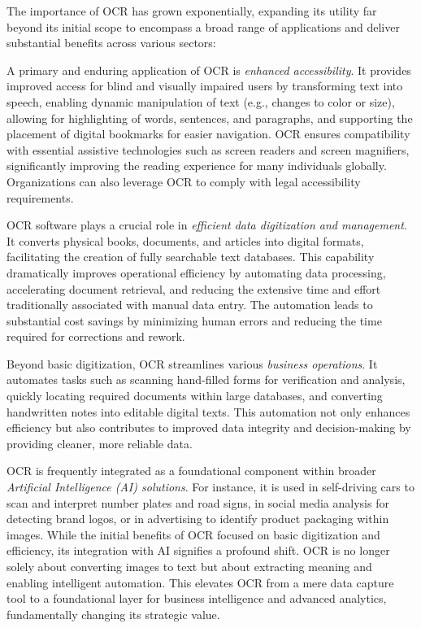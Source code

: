 The importance of OCR has grown exponentially, expanding its utility far beyond its initial scope to encompass a broad range of applications and deliver substantial benefits across various sectors:

A primary and enduring application of OCR is \emph{enhanced accessibility}. It provides improved access for blind and visually impaired users by transforming text into speech, enabling dynamic manipulation of text (e.g., changes to color or size), allowing for highlighting of words, sentences, and paragraphs, and supporting the placement of digital bookmarks for easier navigation. \cite{AdobeOCR,ContinualEngineOCR,OSULibraryOCR} OCR ensures compatibility with essential assistive technologies such as screen readers and screen magnifiers, significantly improving the reading experience for many individuals globally. \cite{ContinualEngineOCR} Organizations can also leverage OCR to comply with legal accessibility requirements. \cite{ContinualEngineOCR}

OCR software plays a crucial role in \emph{efficient data digitization and management}. It converts physical books, documents, and articles into digital formats, facilitating the creation of fully searchable text databases. \cite{AWSOCR,ContinualEngineOCR} This capability dramatically improves operational efficiency by automating data processing, accelerating document retrieval, and reducing the extensive time and effort traditionally associated with manual data entry. \cite{AWSOCR,DigitalDefyndOCR} The automation leads to substantial cost savings by minimizing human errors and reducing the time required for corrections and rework. \cite{DigitalDefyndOCR,DocuwareOCR}

Beyond basic digitization, OCR streamlines various \emph{business operations}. It automates tasks such as scanning hand-filled forms for verification and analysis, quickly locating required documents within large databases, and converting handwritten notes into editable digital texts. \cite{AWSOCR,AdobeOCR} This automation not only enhances efficiency but also contributes to improved data integrity and decision-making by providing cleaner, more reliable data. \cite{DigitalDefyndOCR}

OCR is frequently integrated as a foundational component within broader \emph{Artificial Intelligence (AI) solutions}. For instance, it is used in self-driving cars to scan and interpret number plates and road signs, in social media analysis for detecting brand logos, or in advertising to identify product packaging within images. \cite{AWSOCR} While the initial benefits of OCR focused on basic digitization and efficiency, its integration with AI signifies a profound shift. OCR is no longer solely about converting images to text but about extracting meaning and enabling intelligent automation. This elevates OCR from a mere data capture tool to a foundational layer for business intelligence and advanced analytics, fundamentally changing its strategic value.

